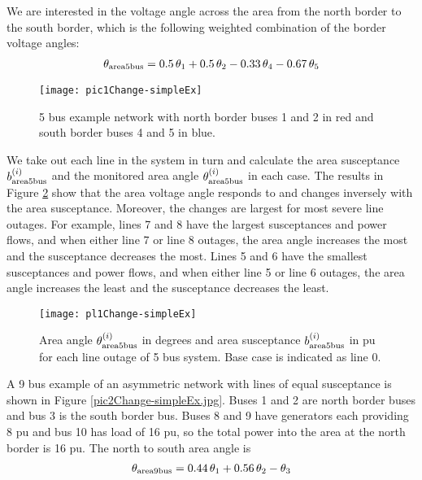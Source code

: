 \documentclass[conference]{IEEEtran}
\begin{document}
We are interested in the voltage angle across the area from the north border to the south border, which is the following weighted combination of the 
 border voltage angles:
 \begin{align}
\theta_{\rm area5bus}
=0.5 \, \theta_1+0.5 \, \theta_2-0.33\,  \theta_4-0.67 \,\theta_5
\label{theta1-simpleEx}
\end{align}

 

 
\begin{figure}[h]
\begin{center}
\texttt{[image: pic1Change-simpleEx]}
\caption{5 bus example network with north border buses 1 and 2  in red and south border buses 4 and 5 in blue.}
\label{pic1Change-simpleEx}
\end{center}
\end{figure}


We take out each line in the system in turn and calculate the area susceptance $b_{\rm area5bus}^{(i)}$ and the monitored area angle $\theta_{\rm area5bus}^{(i)}$ in each case.
The results in Figure \ref{pl1Change-simpleEx} show that the area voltage angle responds to and changes inversely with the area susceptance. 
Moreover, the changes are largest for most severe  line outages. 
For example,  lines 7 and 8  have the largest susceptances and power flows, and when either line 7 or line 8 outages, the area angle increases the most and the susceptance decreases the most.
Lines 5 and 6  have the smallest susceptances and  power flows, and when either line 5 or line 6 outages, the area angle increases the least and the susceptance decreases the least.

 
 
\begin{figure}[h]
\begin{center}
\texttt{[image: pl1Change-simpleEx]}
\caption{Area  angle $\theta_{\rm area5bus}^{(i)}$ in degrees and area susceptance $b_{\rm area5bus}^{(i)}$  in pu for each line outage of 5 bus system. Base case is indicated as line 0.}
\label{pl1Change-simpleEx}
\end{center}
\end{figure} 

A 9 bus example of an asymmetric network with lines of equal susceptance is shown in Figure \ref{pic2Change-simpleEx.jpg}.
 Buses 1 and 2 are north border buses and bus 3 is the south border bus. Buses  8 and 9 have generators each providing 8 pu and bus 10 has load of 16 pu, so the total power into the area at the north border is 16 pu.
 The north to south area angle is  
 \begin{align}
\theta_{\rm area9bus}
=0.44\,  \theta_1+0.56\,  \theta_2-  \theta_3
\label{theta2-simpleEx}
\end{align}
\end{document}
